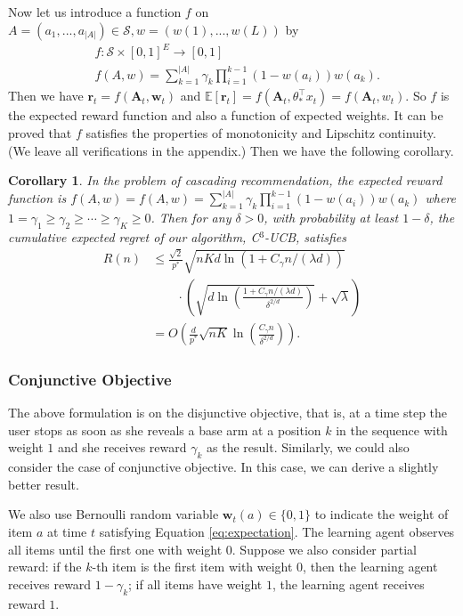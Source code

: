 \documentclass{article}
\newcommand{\EE}{\mathbb{E}}
\newcommand{\bA}{\mathbf{A}}
\newcommand{\br}{\mathbf{r}}
\newcommand{\bw}{\mathbf{w}}
\newcommand{\cS}{\mathcal{S}}
\newcommand{\abs}[1]{\left| #1 \right|}
\newtheorem{corollary}[theorem]{Corollary}%
\begin{document}
Now let us introduce a function $f$ on $A = (a_1,...,a_{\abs{A}}) \in \cS, w = (w(1),...,w(L))$ by
\begin{align}
&f : \cS \times [0,1]^E \to [0,1] \nonumber \\
&f(A,w) = \sum_{k = 1}^{\abs{A}} \gamma_{k} \prod_{i=1}^{k-1} (1 - w(a_i)) w(a_k). \label{eq:OrRewardFunc}
\end{align}
Then we have $\br_t = f(\bA_t, \bw_t)$ and $\EE[\br_t] = f(\bA_t, \theta_{\ast}^{\top}x_t) = f(\bA_t, w_t)$. So $f$ is the expected reward function and also a function of expected weights. It can be proved that $f$ satisfies the properties of monotonicity and Lipschitz continuity. (We leave all verifications in the appendix.) Then we have the following corollary.
\begin{corollary}
	\label{cor:or}
	In the problem of cascading recommendation, the expected reward function is $f(A, w) = f(A,w) = \sum_{k = 1}^{\abs{A}} \gamma_{k} \prod_{i=1}^{k-1} (1 - w(a_i)) w(a_k)$ where $1 = \gamma_1 \geq \gamma_2 \geq \cdots \geq \gamma_K \geq 0$. Then for any $\delta > 0$, with probability at least $1 - \delta$, the cumulative expected regret of our algorithm, C$^3$-UCB, satisfies
	\begin{align}
		R(n) &\le \frac{\sqrt{2}}{p^*} \sqrt{nKd\ln(1 + C_\gamma n/(\lambda d))}  \nonumber \\
		&\qquad \cdot \left(\sqrt{d\ln \left( \frac{1 + C_\gamma n/(\lambda d)}{\delta^{2/d}}\right) } + \sqrt{\lambda}\right) \nonumber \\
		&=O\left(\frac{d}{p^*} \sqrt{nK} \ln \left(\frac{C_\gamma n}{\delta^{2/d}}\right) \right).
	\end{align}
\end{corollary}

\subsubsection{Conjunctive Objective}

The above formulation is on the disjunctive objective, that is, at a time step the user stops as soon as she reveals a base arm at a position $k$ in the sequence with weight $1$ and she receives reward $\gamma_k$ as the result. Similarly, we could also consider the case of conjunctive objective. In this case, we can derive a slightly better result.

We also use Bernoulli random variable $\bw_{t}(a) \in \{0,1\}$ to indicate the weight of item $a$ at time $t$ satisfying Equation \eqref{eq:expectation}. The learning agent observes all items until the first one with weight $0$. Suppose we also consider partial reward: if the $k$-th item is the first item with weight $0$, then the learning agent receives reward $1-\gamma_k$; if all items have weight $1$, the learning agent receives reward $1$. 
\end{document}
